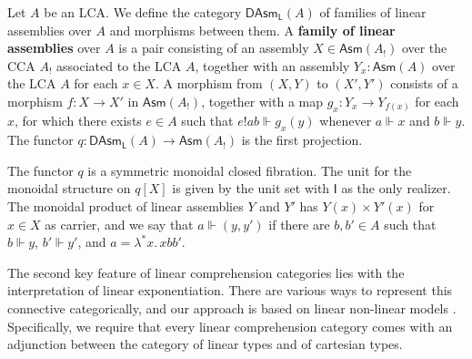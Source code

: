 \documentclass[a4paper,UKenglish,cleveref,numberwithinsect, autoref, thm-restate]{lipics-v2021}
\newcommand{\I}{\mathsf{I}}
\newcommand{\fiber}[2]{#1[#2]}
\newcommand{\LCA}{A}
\newcommand{\LCAtoPCA}[1]{#1_!}
\newcommand{\linpair}[2]{\langle #1 , #2 \rangle}
\newcommand{\Asm}[1]{\mathsf{Asm}(#1)}
\newcommand{\LAsm}[1]{\mathsf{DAsm}_{\mathsf{L}}(#1)}
\newcommand{\LAsmPr}{q}
\newcommand{\realize}{\Vdash}
\newcommand{\expL}[1]{\mathbin{!} #1}
\begin{document}
\begin{example}
\label{exa:monoidal-fibration-lca}
Let $\LCA$ be an LCA.
We define the category $\LAsm{\LCA}$ of families of linear assemblies over $\LCA$
and morphisms between them.
A \textbf{family of linear assemblies}
over $\LCA$ is a pair consisting of an assembly $X \in \Asm{\LCAtoPCA{\LCA}}$ over the CCA $\LCAtoPCA{A}$ associated to the LCA $\LCA$, together with an
assembly $Y_x : \Asm{\LCA}$ over the LCA $\LCA$ for each $x \in X$.
A morphism from $(X, Y)$ to $(X', Y')$
consists of a morphism $f : X \rightarrow X'$ in $\Asm{\LCAtoPCA{A}}$,
together with a map $g_x : Y_x \rightarrow Y_{f(x)}$ for each $x$, for which there exists $e \in A$
such that $e {\expL{a}} b \realize g_x(y)$ whenever $a \realize x$ and $b \realize y$.
The functor $\LAsmPr : \LAsm{\LCA} \rightarrow \Asm{\LCAtoPCA{\LCA}}$ is the first projection.

The functor $\LAsmPr$ is a symmetric monoidal closed fibration.
The unit for the monoidal structure on $\fiber{\LAsmPr}{X}$ is given by the unit set with $\I$ as the only realizer.
The monoidal product of linear assemblies $Y$ and $Y'$
has $Y(x) \times Y'(x)$ for $x \in X$ as carrier,
and we say that $a \realize (y, y')$ if there are $b, b' \in \LCA$
such that $b \realize y$, $b' \realize y'$,
and $a = \lambda^* x .\, x b b'$.
\end{example}


The second key feature of linear comprehension categories lies with the interpretation of linear exponentiation.
There are various ways to represent this connective categorically,
and our approach is based on linear non-linear models \cite{Benton1994LNL}.
Specifically,
we require that every linear comprehension category comes with an adjunction between the category of linear types and of cartesian types.
\end{document}

